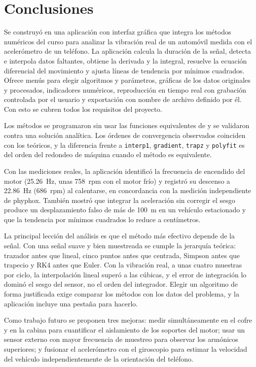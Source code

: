 \section{Conclusiones}

Se construyó en \matlab{} una aplicación con interfaz gráfica que integra los métodos numéricos del curso para analizar la vibración real de un automóvil medida con el acelerómetro de un teléfono. La aplicación calcula la duración de la señal, detecta e interpola datos faltantes, obtiene la derivada y la integral, resuelve la ecuación diferencial del movimiento y ajusta líneas de tendencia por mínimos cuadrados. Ofrece menús para elegir algoritmos y parámetros, gráficas de los datos originales y procesados, indicadores numéricos, reproducción en tiempo real con grabación controlada por el usuario y exportación con nombre de archivo definido por él. Con esto se cubren todos los requisitos del proyecto.

Los métodos se programaron sin usar las funciones equivalentes de \matlab{} y se validaron contra una solución analítica. Los órdenes de convergencia observados coinciden con los teóricos, y la diferencia frente a \texttt{interp1}, \texttt{gradient}, \texttt{trapz} y \texttt{polyfit} es del orden del redondeo de máquina cuando el método es equivalente.

Con las mediciones reales, la aplicación identificó la frecuencia de encendido del motor (25.26~Hz, unas 758~rpm con el motor frío) y registró su descenso a 22.86~Hz (686~rpm) al calentarse, en concordancia con la medición independiente de phyphox. También mostró que integrar la aceleración sin corregir el sesgo produce un desplazamiento falso de más de 100~m en un vehículo estacionado y que la tendencia por mínimos cuadrados lo reduce a centímetros.

La principal lección del análisis es que el método más efectivo depende de la señal. Con una señal suave y bien muestreada se cumple la jerarquía teórica: trazador antes que lineal, cinco puntos antes que centrada, Simpson antes que trapecio y RK4 antes que Euler. Con la vibración real, a unas cuatro muestras por ciclo, la interpolación lineal superó a las cúbicas, y el error de integración lo dominó el sesgo del sensor, no el orden del integrador. Elegir un algoritmo de forma justificada exige comparar los métodos con los datos del problema, y la aplicación incluye una pestaña para hacerlo.

Como trabajo futuro se proponen tres mejoras: medir simultáneamente en el cofre y en la cabina para cuantificar el aislamiento de los soportes del motor; usar un sensor externo con mayor frecuencia de muestreo para observar los armónicos superiores; y fusionar el acelerómetro con el giroscopio para estimar la velocidad del vehículo independientemente de la orientación del teléfono.
